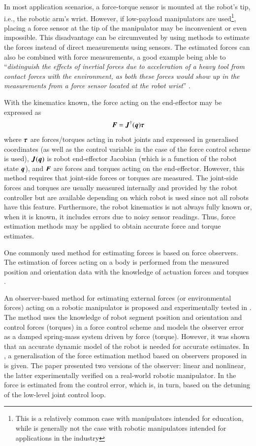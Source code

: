 In most application scenarios, a force-torque sensor is mounted at the robot's tip, i.e., the robotic arm's wrist. However, if low-payload manipulators are used\footnote{This is a relatively common case with manipulators intended for education, while is generally not the case with robotic manipulators intended for applications in the industry}, placing a force sensor at the tip of the manipulator may be inconvenient or even impossible. This disadvantage can be circumvented by using methods to estimate the forces instead of direct measurements using sensors. The estimated forces can also be combined with force measurements, a good example being able to ``\emph{distinguish the effects of inertial forces due to acceleration of a heavy tool from contact forces with the environment, as both these forces would show up in the measurements from a force sensor located at the robot wrist}'' \cite{Alcocer2003}.

With the kinematics known, the force acting on the end-effector may be expressed as 
\[
    {\bm{F}} = {\bm{J}}^\dagger({\bm{q}}){\bm{\tau}}
\]
where ${\bm{\tau}}$ are forces/torques acting in robot joints and expressed in generalised coordinates (as well as the control variable in the case of the force control scheme is used), ${\bm{J}}({\bm{q}})$ is robot end-effector Jacobian (which is a function of the robot state ${\bm{q}}$), and ${\bm{F}}$ are forces and torques acting on the end-effector. However, this method requires that joint-side forces or torques are measured. The joint-side forces and torques are usually measured internally and provided by the robot controller but are available depending on which robot is used since not all robots have this feature. Furthermore, the robot kinematics is not always fully known or, when it is known, it includes errors due to noisy sensor readings. Thus, force estimation methods may be applied to obtain accurate force and torque estimates. 

One commonly used method for estimating forces is based on force observers. The estimation of forces acting on a body is performed from the measured position and orientation data with the knowledge of actuation forces and torques \cite{Hacksel1994,Ohishi1991,Eom1998,Alcocer2003,Stolt2012}.

An observer-based method for estimating external forces (or environmental forces) acting on a robotic manipulator is proposed and experimentally tested in \cite{Hacksel1994}. The method uses the knowledge of robot segment position and orientation and control forces (torques) in a force control scheme and models the observer error as a damped spring-mass system driven by force (torque). However, it was shown that an accurate dynamic model of the robot is needed for accurate estimates. In \cite{Alcocer2003}, a generalisation of the force estimation method based on observers proposed in \cite{Hacksel1994} is given. The paper presented two versions of the observer: linear and nonlinear, the latter experimentally verified on a real-world robotic manipulator. In \cite{Stolt2012} the force is estimated from the control error, which is, in turn, based on the detuning of the low-level joint control loop.

